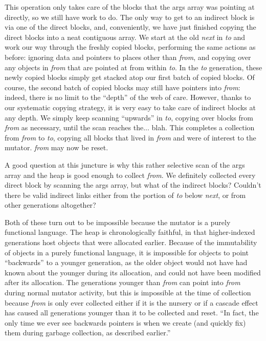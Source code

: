 This operation only takes care of the blocks that 
the args array was pointing at directly, so we still have work
to do. The only way to get to an indirect 
block is via one of the direct blocks, and, conveniently, we have
just finished copying the direct blocks into a neat contiguous
array. We start at the old \emph{next} in \emph{to}
and work our way through the freshly copied blocks, performing
the same actions as before: ignoring data and pointers to 
places other than \emph{from}, and copying over any objects in
\emph{from} that are pointed at from within \emph{to}. In
the \emph{to} generation, these newly copied blocks 
simply get stacked atop our first batch of copied blocks. 
Of course, the second batch of copied blocks may still
have pointers into \emph{from}: indeed, there is no limit to the 
``depth'' of the web of care. However, thanks to our systematic
copying strategy, it is very easy to take care of indirect
blocks at any depth. We simply keep scanning ``upwards'' in 
\emph{to}, copying over blocks from \emph{from} as necessary, 
until the scan reaches the... blah. 
This completes a collection 
from \emph{from} to \emph{to}, copying all blocks that lived
in \emph{from} and were of interest to the mutator. 
\emph{from} may now be reset.

A good question at this juncture is why this rather selective scan 
of the args array and the heap is good enough to collect \emph{from}. 
We definitely collected every direct block by scanning the args array,
but what of the indirect blocks? Couldn't there be valid indirect links
either from the portion of \emph{to} below \emph{next}, 
or from other generations altogether? 

Both of these turn out to be impossible because the mutator
is a purely functional language. The heap is chronologically
faithful, in that higher-indexed generations host
objects that were allocated earlier. Because
of the immutability of objects in a purely functional language, 
it is impossible for objects to point ``backwards'' to 
a younger generation, as the older object would not have
had known about the younger during its allocation, and could not 
have been modified after its allocation. The generations 
younger than \emph{from} can point into \emph{from} during 
normal mutator activity, but this is
impossible at the time of collection 
because \emph{from} is only ever collected either if it is
the nursery or if a cascade effect has caused all generations younger
than it to be collected and reset. 
``In fact, the only time we ever see backwards pointers
is when we create (and quickly fix) them during garbage collection, 
as described earlier.''

